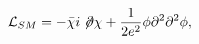 \begin{equation}
{\cal L}_{SM}=-\bar{\chi}i\not\!\partial \chi + \frac{1}{2e^2}\phi \partial^2 \partial^2 \phi,
\end{equation}

